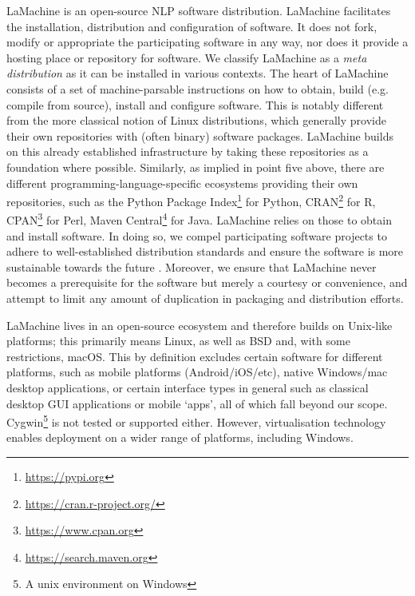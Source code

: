 \documentclass[a4paper,11pt]{article}
\begin{document}
LaMachine is an open-source NLP software distribution.  LaMachine facilitates the installation, distribution and configuration of software. It does not fork, modify or appropriate the participating software in any way, nor does it provide a hosting place or repository for software.
We classify LaMachine as a \emph{meta distribution} as it can be installed in various contexts. The heart of LaMachine consists of a
set of machine-parsable instructions on how to obtain, build (e.g. compile from source), install and configure software.
This is notably different from the more
classical notion of Linux distributions, which generally provide their own repositories with (often binary) software
packages. LaMachine builds on this already established infrastructure by taking these repositories as a foundation where
possible. Similarly, as implied in point five above, there are different programming-language-specific ecosystems
providing their own repositories, such as the Python Package Index\footnote{\url{https://pypi.org}} for Python,
CRAN\footnote{\url{https://cran.r-project.org/}} for R, CPAN\footnote{\url{https://www.cpan.org}} for Perl, Maven
Central\footnote{\url{https://search.maven.org}} for Java.  LaMachine relies on those to obtain and install software. In doing so, we compel participating software projects
to adhere to well-established distribution standards and ensure the software is more sustainable towards the future
\cite{softwarequality}. Moreover, we ensure that LaMachine never becomes a prerequisite for the software but merely a
courtesy or convenience, and attempt to limit any amount of duplication in packaging and distribution efforts.

LaMachine lives in an open-source ecosystem and therefore builds on Unix-like platforms; this primarily means Linux, as well as BSD and, with some restrictions, macOS. This by definition excludes certain software for different platforms, such as mobile platforms (Android/iOS/etc), native Windows/mac desktop applications, or certain interface types in general such as classical desktop GUI applications or mobile `apps', all of which fall beyond our scope. Cygwin\footnote{A unix environment on Windows} is not tested or
 supported either.  However, virtualisation technology enables deployment on a wider range of platforms, including Windows.
\end{document}
